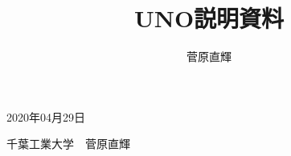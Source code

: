 \documentclass[11pt]{ltjsarticle}
\title{UNO説明資料}
\author{菅原直輝}
\begin{document}
\thispagestyle{empty}
\vspace*{20pt}

\begin{flushright}
  2020年04月29日

  千葉工業大学　菅原直輝
\end{flushright}


\nocite{*}

\end{document}
